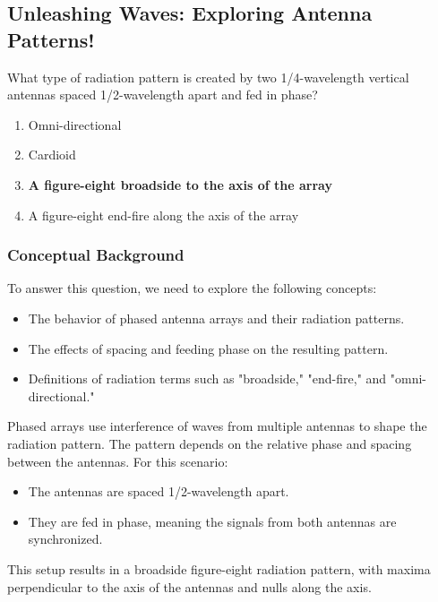 \subsection{Unleashing Waves: Exploring Antenna Patterns!}

\begin{tcolorbox}[colback=gray!10, colframe=black, title=E9C03]

What type of radiation pattern is created by two 1/4-wavelength vertical antennas spaced 1/2-wavelength apart and fed in phase?

\begin{enumerate}[label=\Alph*.]
    \item Omni-directional
    \item Cardioid
    \item \textbf{A figure-eight broadside to the axis of the array}
    \item A figure-eight end-fire along the axis of the array
\end{enumerate} \end{tcolorbox}


\subsubsection{Conceptual Background}

To answer this question, we need to explore the following concepts:
\begin{itemize}
    \item The behavior of phased antenna arrays and their radiation patterns.
    \item The effects of spacing and feeding phase on the resulting pattern.
    \item Definitions of radiation terms such as "broadside," "end-fire," and "omni-directional."
\end{itemize}

Phased arrays use interference of waves from multiple antennas to shape the radiation pattern. The pattern depends on the relative phase and spacing between the antennas. For this scenario:
\begin{itemize}
    \item The antennas are spaced 1/2-wavelength apart.
    \item They are fed in phase, meaning the signals from both antennas are synchronized.
\end{itemize}
This setup results in a broadside figure-eight radiation pattern, with maxima perpendicular to the axis of the antennas and nulls along the axis.

